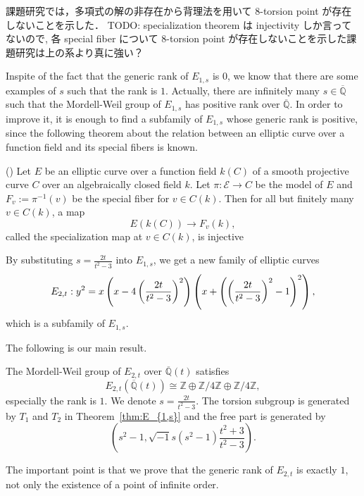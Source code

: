 \documentclass[main]{subfiles}
\begin{document}
\begin{rem}
    課題研究では，多項式の解の非存在から背理法を用いて 8-torsion point が存在しないことを示した．
    TODO: specialization theorem は injectivity しか言ってないので, 各 special fiber について 8-torsion point が存在しないことを示した課題研究は上の系より真に強い？
\end{rem}

Inspite of the fact that the generic rank of $E_{1,s}$ is $0$, we know that there are some examples of $s$ such that the rank is $1$.
Actually, there are infinitely many $s \in \overline{\mathbb{Q}}$ such that the Mordell-Weil group of $E_{1,s}$ has positive rank over $\overline{\mathbb{Q}}$.
In order to improve it, it is enough to find a subfamily of $E_{1,s}$ whose generic rank is positive, since the following theorem about the relation between an elliptic curve over a function field and its special fibers is known.
\begin{thm}{(\cite[Theorem 11.4.]{ref:advancedaec})}
    Let $E$ be an elliptic curve over a function field $k(C)$ of a smooth projective curve $C$ over an algebraically closed field $k$.
    Let $\pi: \mathcal{E} \to C$ be the \Neron{} model of $E$ and $F_v:=\pi^{-1}(v)$ be the special fiber for $v \in C(k)$.
    Then for all but finitely many $v \in C(k)$, a map
    \begin{equation}
        E(k(C)) \to F_{v}(k),
    \end{equation}
    called the specialization map at $v \in C(k)$, is injective
\end{thm}

By substituting $s = \frac{2t}{t^{2} - 3}$ into $E_{1,s}$, we get a new family of elliptic curves
\begin{equation}
    \label{eq:E_{2,t}}
        E_{2,t}: y^{2} = x\left(x - 4\left(\frac{2t}{t^{2} - 3}\right)^{2}\right)\left(x + \left(\left(\frac{2t}{t^{2} - 3}\right)^{2} - 1\right)^{2}\right),
    \end{equation}
which is a subfamily of $E_{1,s}$.

The following is our main result.
\begin{thm}
    \label{thm:E_{2,t}}
    The Mordell-Weil group of $E_{2,t}$ over $\overline{\mathbb{Q}}(t)$ satisfies
    \begin{equation}
        E_{2,t}(\overline{\mathbb{Q}}(t)) \cong \mathbb{Z} \oplus \mathbb{Z} / 4 \mathbb{Z} \oplus \mathbb{Z} / 4 \mathbb{Z},
    \end{equation}
    especially the rank is $1$.
    We denote $s = \frac{2t}{t^{2} - 3}$. The torsion subgroup is generated by $T_1$ and $T_2$ in Theorem~\ref{thm:E_{1,s}} and the free part is generated by
    \begin{equation}
        \left(s^{2} - 1, \sqrt{-1} s(s^{2} - 1) \frac{t^{2} + 3}{t^{2} - 3} \right).
    \end{equation}
\end{thm}
The important point is that we prove that the generic rank of $E_{2,t}$ is exactly $1$, not only the existence of a point of infinite order.
\end{document}
